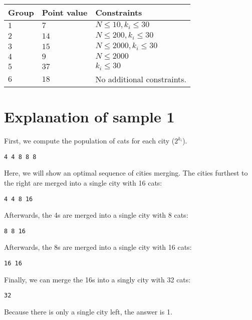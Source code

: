\noindent
\begin{tabular}{| l | l | p{12cm} |}
  \hline
  \textbf{Group} & \textbf{Point value} & \textbf{Constraints} \\ \hline
  $1$    & $7$       & $N \leq 10, k_i \leq 30$ \\ \hline
  $2$    & $14$      & $N \leq 200, k_i \leq 30$ \\ \hline
  $3$    & $15$      & $N \leq 2000, k_i \leq 30$ \\ \hline
  $4$    & $9$       & $N \leq 2000$ \\ \hline
  $5$    & $37$      & $k_i \leq 30$ \\ \hline
  $6$    & $18$      & No additional constraints. \\ \hline
\end{tabular}


\section*{Explanation of sample 1}

First, we compute the population of cats for each city ($2^{k_i}$).
\begin{verbatim}
4 4 8 8 8
\end{verbatim}
Here, we will show an optimal sequence of cities merging.
The cities furthest to the right are merged into a single city with 16 cats:
\begin{verbatim}
4 4 8 16
\end{verbatim}
Afterwards, the 4s are merged into a single city with 8 cats:
\begin{verbatim}
8 8 16
\end{verbatim}
Afterwards, the 8s are merged into a single city with 16 cats:
\begin{verbatim}
16 16
\end{verbatim}
Finally, we can merge the 16s into a singly city with 32 cats:
\begin{verbatim}
32
\end{verbatim}

Because there is only a single city left, the answer is 1.
